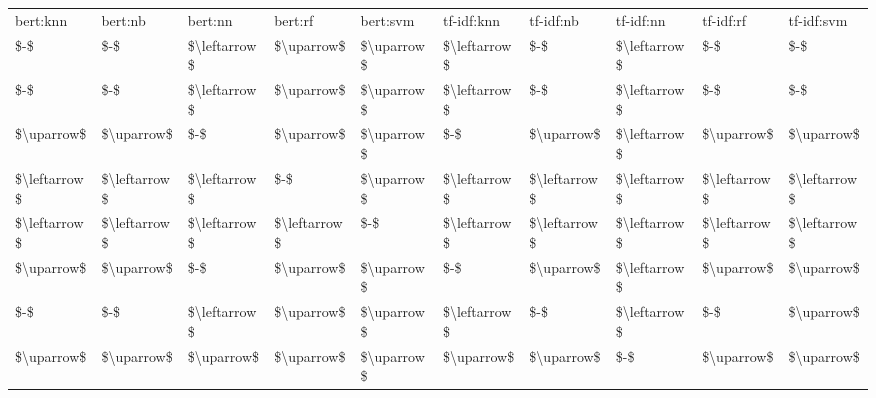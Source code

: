 \begin{tabular}{llllllllll}
\toprule
    bert:knn &      bert:nb &      bert:nn &      bert:rf &   bert:svm &   tf-idf:knn &    tf-idf:nb &    tf-idf:nn &    tf-idf:rf &   tf-idf:svm \\
         \$-\$ &          \$-\$ & \$\textbackslash leftarrow\$ &   \$\textbackslash uparrow\$ & \$\textbackslash uparrow\$ & \$\textbackslash leftarrow\$ &          \$-\$ & \$\textbackslash leftarrow\$ &          \$-\$ &          \$-\$ \\
\midrule
         \$-\$ &          \$-\$ & \$\textbackslash leftarrow\$ &   \$\textbackslash uparrow\$ & \$\textbackslash uparrow\$ & \$\textbackslash leftarrow\$ &          \$-\$ & \$\textbackslash leftarrow\$ &          \$-\$ &          \$-\$ \\
  \$\textbackslash uparrow\$ &   \$\textbackslash uparrow\$ &          \$-\$ &   \$\textbackslash uparrow\$ & \$\textbackslash uparrow\$ &          \$-\$ &   \$\textbackslash uparrow\$ & \$\textbackslash leftarrow\$ &   \$\textbackslash uparrow\$ &   \$\textbackslash uparrow\$ \\
\$\textbackslash leftarrow\$ & \$\textbackslash leftarrow\$ & \$\textbackslash leftarrow\$ &          \$-\$ & \$\textbackslash uparrow\$ & \$\textbackslash leftarrow\$ & \$\textbackslash leftarrow\$ & \$\textbackslash leftarrow\$ & \$\textbackslash leftarrow\$ & \$\textbackslash leftarrow\$ \\
\$\textbackslash leftarrow\$ & \$\textbackslash leftarrow\$ & \$\textbackslash leftarrow\$ & \$\textbackslash leftarrow\$ &        \$-\$ & \$\textbackslash leftarrow\$ & \$\textbackslash leftarrow\$ & \$\textbackslash leftarrow\$ & \$\textbackslash leftarrow\$ & \$\textbackslash leftarrow\$ \\
  \$\textbackslash uparrow\$ &   \$\textbackslash uparrow\$ &          \$-\$ &   \$\textbackslash uparrow\$ & \$\textbackslash uparrow\$ &          \$-\$ &   \$\textbackslash uparrow\$ & \$\textbackslash leftarrow\$ &   \$\textbackslash uparrow\$ &   \$\textbackslash uparrow\$ \\
         \$-\$ &          \$-\$ & \$\textbackslash leftarrow\$ &   \$\textbackslash uparrow\$ & \$\textbackslash uparrow\$ & \$\textbackslash leftarrow\$ &          \$-\$ & \$\textbackslash leftarrow\$ &          \$-\$ &   \$\textbackslash uparrow\$ \\
  \$\textbackslash uparrow\$ &   \$\textbackslash uparrow\$ &   \$\textbackslash uparrow\$ &   \$\textbackslash uparrow\$ & \$\textbackslash uparrow\$ &   \$\textbackslash uparrow\$ &   \$\textbackslash uparrow\$ &          \$-\$ &   \$\textbackslash uparrow\$ &   \$\textbackslash uparrow\$ \\

\end{tabular}

